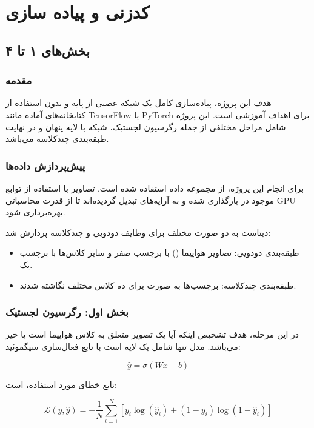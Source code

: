 	\section{ کدزنی و پیاده سازی‬}
	
	\subsection{بخش‌های ۱ تا ۴}
	
	\subsubsection{مقدمه}
	
	هدف این پروژه، پیاده‌سازی کامل یک شبکه عصبی از پایه و بدون استفاده از کتابخانه‌های آماده مانند TensorFlow یا PyTorch برای اهداف آموزشی است. این پروژه شامل مراحل مختلفی از جمله رگرسیون لجستیک، شبکه با لایه پنهان و در نهایت طبقه‌بندی چندکلاسه می‌باشد.
	
	\subsubsection{پیش‌پردازش داده‌ها}
	
	برای انجام این پروژه، از مجموعه داده  استفاده شده است. تصاویر با استفاده از توابع موجود در  بارگذاری شده و به آرایه‌های  تبدیل گردیده‌اند تا از قدرت محاسباتی GPU بهره‌برداری شود.
	
	دیتاست به دو صورت مختلف برای وظایف دودویی و چندکلاسه پردازش شد:
	\begin{itemize}
		\item طبقه‌بندی دودویی: تصاویر هواپیما () با برچسب صفر و سایر کلاس‌ها با برچسب یک.
		\item طبقه‌بندی چندکلاسه: برچسب‌ها به صورت  برای ده کلاس مختلف نگاشته شدند.
	\end{itemize}
	
	\subsubsection{بخش اول: رگرسیون لجستیک}
	
	در این مرحله، هدف تشخیص اینکه آیا یک تصویر متعلق به کلاس هواپیما است یا خیر می‌باشد. مدل تنها شامل یک لایه است با تابع فعال‌سازی سیگموئید:
	
	\[
	\hat{y} = \sigma(Wx + b)
	\]
	
	تابع خطای مورد استفاده،  است:
	
	\[
	\mathcal{L}(y, \hat{y}) = - \frac{1}{N} \sum_{i=1}^N \left[ y_i \log(\hat{y}_i) + (1 - y_i) \log(1 - \hat{y}_i) \right]
	\]
	
